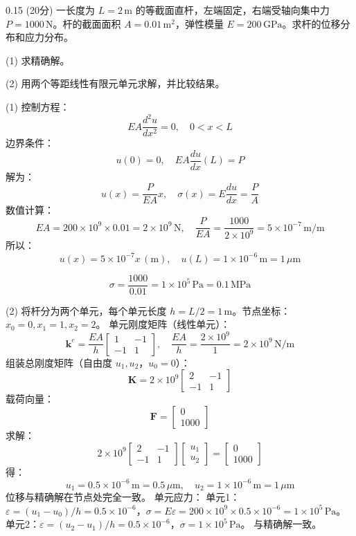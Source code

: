 \begin{question}{0.15}
    (20分) 一长度为 \( L = 2 \, \text{m} \) 的等截面直杆，左端固定，右端受轴向集中力 \( P = 1000 \, \text{N} \)。杆的截面面积 \( A = 0.01 \, \text{m}^2 \)，弹性模量 \( E = 200 \, \text{GPa} \)。求杆的位移分布和应力分布。

(1) 求精确解。

(2) 用两个等距线性有限元单元求解，并比较结果。
\end{question}

\begin{solution}
(1) 控制方程：
$$
EA \frac{d^2 u}{dx^2} = 0, \quad 0 < x < L
$$
边界条件：
$$
u(0) = 0, \quad EA \frac{du}{dx}(L) = P
$$
解为：
$$
u(x) = \frac{P}{EA} x, \quad \sigma(x) = E \frac{du}{dx} = \frac{P}{A}
$$
数值计算：
$$
EA = 200 \times 10^9 \times 0.01 = 2 \times 10^9 \, \text{N}, \quad \frac{P}{EA} = \frac{1000}{2 \times 10^9} = 5 \times 10^{-7} \, \text{m/m}
$$
所以：
$$
u(x) = 5 \times 10^{-7} x \, (\text{m}), \quad u(L) = 1 \times 10^{-6} \, \text{m} = 1 \, \mu\text{m}
$$

$$
\sigma = \frac{1000}{0.01} = 1 \times 10^5 \, \text{Pa} = 0.1 \, \text{MPa}
$$

(2) 将杆分为两个单元，每个单元长度 \( h = L/2 = 1 \, \text{m} \)。节点坐标：\( x_0 = 0, x_1 = 1, x_2 = 2 \)。  
单元刚度矩阵（线性单元）：
$$
\mathbf{k}^e = \frac{EA}{h} \begin{bmatrix} 1 & -1 \\ -1 & 1 \end{bmatrix}, \quad \frac{EA}{h} = \frac{2 \times 10^9}{1} = 2 \times 10^9 \, \text{N/m}
$$
组装总刚度矩阵（自由度 \( u_1, u_2 \)，\( u_0 = 0 \)）：
$$
\mathbf{K} = 2 \times 10^9 \begin{bmatrix} 2 & -1 \\ -1 & 1 \end{bmatrix}
$$
载荷向量：
$$
\mathbf{F} = \begin{bmatrix} 0 \\ 1000 \end{bmatrix}
$$
求解：
$$
2 \times 10^9 \begin{bmatrix} 2 & -1 \\ -1 & 1 \end{bmatrix} \begin{bmatrix} u_1 \\ u_2 \end{bmatrix} = \begin{bmatrix} 0 \\ 1000 \end{bmatrix}
$$
得：
$$
u_1 = 0.5 \times 10^{-6} \, \text{m} = 0.5 \, \mu\text{m}, \quad u_2 = 1 \times 10^{-6} \, \text{m} = 1 \, \mu\text{m}
$$
位移与精确解在节点处完全一致。  
单元应力：  
单元1：\( \varepsilon = (u_1 - u_0)/h = 0.5 \times 10^{-6} \)，\( \sigma = E \varepsilon = 200 \times 10^9 \times 0.5 \times 10^{-6} = 1 \times 10^5 \, \text{Pa} \)。  
单元2：\( \varepsilon = (u_2 - u_1)/h = 0.5 \times 10^{-6} \)，\( \sigma = 1 \times 10^5 \, \text{Pa} \)。  
与精确解一致。

\end{solution}
